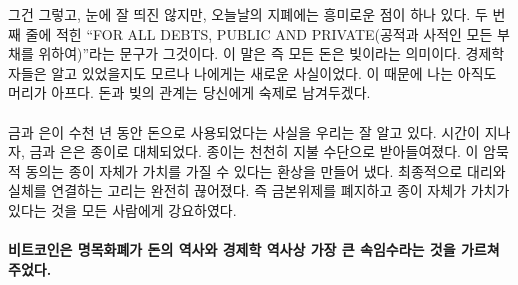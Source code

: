 \begin{comment}
By the way, there is another interesting lesson on today's bank notes,
hidden in plain sight. The second line reads that this is legal tender
\enquote{FOR ALL DEBTS, PUBLIC AND PRIVATE}. What might be obvious to economists
was surprising to me: All money is debt. My head is still hurting
because of it, and I will leave the exploration of the relation of money
and debt as an exercise to the reader.
\end{comment}
그건 그렇고, 눈에 잘 띄진 않지만, 오늘날의 지폐에는 흥미로운 점이 하나 있다. 
두 번째 줄에 적힌 
\enquote{FOR ALL DEBTS, PUBLIC AND PRIVATE(공적과 사적인 모든 부채를 위하여)}라는 문구가
그것이다. 
이 말은 즉 모든 돈은 빚이라는 의미이다. 
경제학자들은 알고 있었을지도 모르나 나에게는 새로운 사실이었다. 
이 때문에  나는 아직도 머리가 아프다. 
돈과 빚의 관계는 당신에게 숙제로 남겨두겠다.

\paragraph{}
\begin{comment}
As we have seen, gold and silver were used as money for millennia. Over
time, coins made from gold and silver were replaced by paper. Paper
slowly became accepted as payment. This acceptance created an
illusion --- the illusion that the paper itself has value. The final
move was to completely sever the link between the representation and the
actual: abolishing the gold standard and convincing everyone that the
paper in itself is precious.
\end{comment}
금과 은이 수천 년 동안 돈으로 사용되었다는 사실을 우리는 잘 알고 있다. 
시간이 지나자, 금과 은은 종이로 대체되었다. 
종이는 천천히 지불 수단으로 받아들여졌다. 
이 암묵적 동의는 종이 자체가 가치를 가질 수 있다는 환상을 만들어 냈다. 
최종적으로 대리와 실체를 연결하는 고리는 완전히 끊어졌다.
즉 금본위제를 폐지하고 종이 자체가 가치가 있다는 것을 모든 사람에게 강요하였다.

\begin{comment}
\paragraph{Bitcoin taught me about the history of money and the greatest sleight of
hand in the history of economics: fiat currency.}
\end{comment}
\paragraph{비트코인은 명목화폐가 돈의 역사와 경제학 역사상 가장 큰 속임수라는 것을 가르쳐주었다.}


